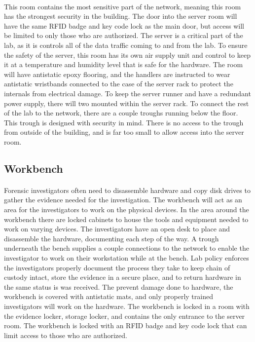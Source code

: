 \documentclass{article}
\begin{document}
\paragraph{}
This room contains the most sensitive part of the network, meaning this room has the strongest security in the building.
The door into the server room will have the same RFID badge and key code lock as the main door, but access will be limited to only those who are authorized.
The server is a critical part of the lab, as it is controls all of the data traffic coming to and from the lab.
To ensure the safety of the server, this room has its own air supply unit and control to keep it at a temperature and humidity level that is safe for the hardware.
The room will have antistatic epoxy flooring, and the handlers are instructed to wear antistatic wristbands connected to the case of the server rack to protect the internals from electrical damage.
To keep the server runner and have a redundant power supply, there will two mounted within the server rack.
To connect the rest of the lab to the network, there are a couple troughs running below the floor.
This trough is designed with security in mind.
There is no access to the trough from outside of the building, and is far too small to allow access into the server room.

\subsection{Workbench}
\paragraph{}
Forensic investigators often need to disassemble hardware and copy disk drives to gather the evidence needed for the investigation.
The workbench will act as an area for the investigators to work on the physical devices.
In the area around the workbench there are locked cabinets to house the tools and equipment needed to work on varying devices.
The investigators have an open desk to place and disassemble the hardware, documenting each step of the way.
A trough underneath the bench supplies a couple connections to the network to enable the investigator to work on their workstation while at the bench.
Lab policy enforces the investigators properly document the process they take to keep chain of custody intact, store the evidence in a secure place, and to return hardware in the same status is was received.
The prevent damage done to hardware, the workbench is covered with antistatic mats, and only properly trained investigators will work on the hardware.
The workbench is locked in a room with the evidence locker, storage locker, and contains the only entrance to the server room.
The workbench is locked with an RFID badge and key code lock that can limit access to those who are authorized.
\end{document}

